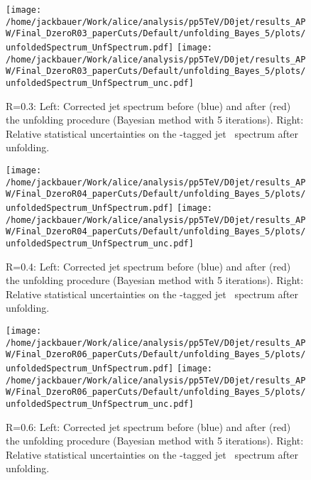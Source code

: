 \begin{figure}[bth]
\centering
\texttt{[image: /home/jackbauer/Work/alice/analysis/pp5TeV/D0jet/results\_APW/Final\_DzeroR03\_paperCuts/Default/unfolding\_Bayes\_5/plots/unfoldedSpectrum\_UnfSpectrum.pdf]}
\texttt{[image: /home/jackbauer/Work/alice/analysis/pp5TeV/D0jet/results\_APW/Final\_DzeroR03\_paperCuts/Default/unfolding\_Bayes\_5/plots/unfoldedSpectrum\_UnfSpectrum\_unc.pdf]}
\caption{R=0.3: Left: Corrected jet \pt spectrum before (blue) and after (red) the unfolding procedure (Bayesian method with 5 iterations). Right: Relative statistical uncertainties on the \Dzero-tagged jet \pt\ spectrum after unfolding.}
\label{fig:UnfSpec_pp_DzeroR03}
\end{figure}
\begin{figure}[bth]
\centering
\texttt{[image: /home/jackbauer/Work/alice/analysis/pp5TeV/D0jet/results\_APW/Final\_DzeroR04\_paperCuts/Default/unfolding\_Bayes\_5/plots/unfoldedSpectrum\_UnfSpectrum.pdf]}
\texttt{[image: /home/jackbauer/Work/alice/analysis/pp5TeV/D0jet/results\_APW/Final\_DzeroR04\_paperCuts/Default/unfolding\_Bayes\_5/plots/unfoldedSpectrum\_UnfSpectrum\_unc.pdf]}
\caption{R=0.4: Left: Corrected jet \pt spectrum before (blue) and after (red) the unfolding procedure (Bayesian method with 5 iterations). Right: Relative statistical uncertainties on the \Dzero-tagged jet \pt\ spectrum after unfolding.}
\label{fig:UnfSpec_pp_DzeroR04}
\end{figure}
\begin{figure}[bth]
\centering
\texttt{[image: /home/jackbauer/Work/alice/analysis/pp5TeV/D0jet/results\_APW/Final\_DzeroR06\_paperCuts/Default/unfolding\_Bayes\_5/plots/unfoldedSpectrum\_UnfSpectrum.pdf]}
\texttt{[image: /home/jackbauer/Work/alice/analysis/pp5TeV/D0jet/results\_APW/Final\_DzeroR06\_paperCuts/Default/unfolding\_Bayes\_5/plots/unfoldedSpectrum\_UnfSpectrum\_unc.pdf]}
\caption{R=0.6: Left: Corrected jet \pt spectrum before (blue) and after (red) the unfolding procedure (Bayesian method with 5 iterations). Right: Relative statistical uncertainties on the \Dzero-tagged jet \pt\ spectrum after unfolding.}
\label{fig:UnfSpec_pp_DzeroR06}
\end{figure}

